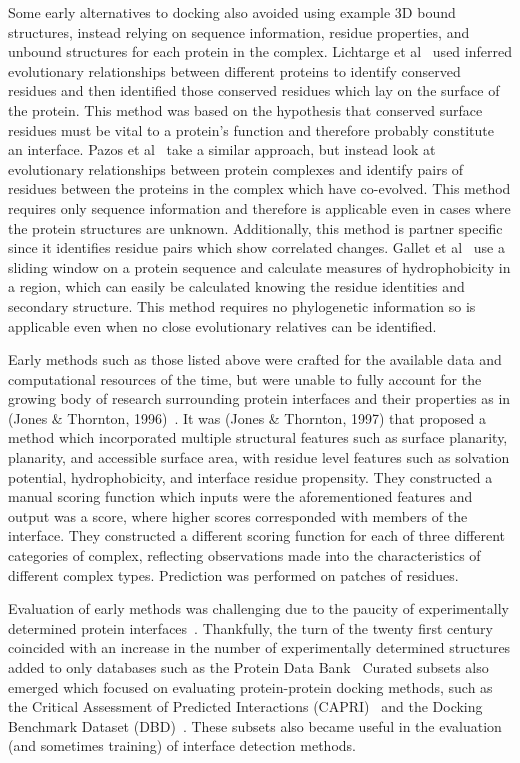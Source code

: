 Some early alternatives to docking also avoided using example 3D bound structures, instead relying on sequence information, residue properties, and unbound structures for each protein in the complex.
Lichtarge et al~\cite{lichtarge1996} used inferred evolutionary relationships between different proteins to identify conserved residues and then identified those conserved residues which lay on the surface of the protein.
This method was based on the hypothesis that conserved surface residues must be vital to a protein's function and therefore probably constitute an interface.
Pazos et al~\cite{pazos1997} take a similar approach, but instead look at evolutionary relationships between protein complexes and identify pairs of residues between the proteins in the complex which have co-evolved.
This method requires only sequence information and therefore is applicable even in cases where the protein structures are unknown. 
Additionally, this method is partner specific since it identifies residue pairs which show correlated changes.
Gallet et al~\cite{gallet2000} use a sliding window on a protein sequence and calculate measures of hydrophobicity in a region, which can easily be calculated knowing the residue identities and secondary structure.
This method requires no phylogenetic information so is applicable even when no close evolutionary relatives can be identified.

Early methods such as those listed above were crafted for the available data and computational resources of the time, but were unable to fully account for the growing body of research surrounding protein interfaces and their properties as in (Jones \& Thornton, 1996)~\cite{jones1996}.
It was (Jones \& Thornton, 1997) that proposed a method which incorporated multiple structural features such as surface planarity, planarity, and accessible surface area, with residue level features such as solvation potential, hydrophobicity, and interface residue propensity.
They constructed a manual scoring function which inputs were the aforementioned features and output was a score, where higher scores corresponded with members of the interface.
They constructed a different scoring function for each of three different categories of complex, reflecting observations made into the characteristics of different complex types.
Prediction was performed on patches of residues.

Evaluation of early methods was challenging due to the paucity of experimentally determined protein interfaces~\cite{esmaielbeiki2015}.
Thankfully, the turn of the twenty first century coincided with an increase in the number of experimentally determined structures added to only databases such as the Protein Data Bank~\cite{berman2000}
Curated subsets also emerged which focused on evaluating protein-protein docking methods, such as the Critical Assessment of Predicted Interactions (CAPRI)~\cite{janin2003} and the Docking Benchmark Dataset (DBD)~\cite{chen2002}.
These subsets also became useful in the evaluation (and sometimes training) of interface detection methods.
	
